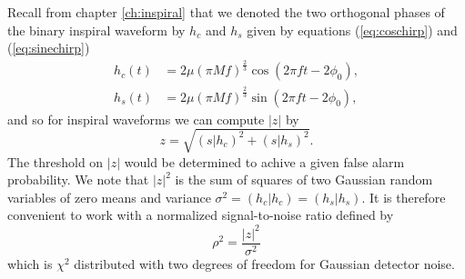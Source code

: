 Recall from chapter \ref{ch:inspiral} that we denoted the two orthogonal
phases of the binary inspiral waveform by $h_c$ and $h_s$ given by equations
(\ref{eq:coschirp}) and (\ref{eq:sinechirp})
\begin{align}
h_c(t) & = 2\mu (\pi M f)^{\frac{2}{3}} \cos(2\pi f t - 2\phi_0), \\
h_s(t) & = 2\mu (\pi M f)^{\frac{2}{3}} \sin(2\pi f t - 2\phi_0),
\end{align}
and so for inspiral waveforms we can compute $|z|$ by
\begin{equation}
z = \sqrt{(s|h_c)^2 + (s|h_s)^2}.
\end{equation}
The threshold on $|z|$ would be determined to achive a given false alarm
probability. We note that $|z|^2$ is the sum of squares of two Gaussian random
variables of zero means and variance $\sigma^2 = (h_c|h_c) = (h_s|h_s)$. It is
therefore convenient to work with a normalized signal-to-noise ratio
defined by
\begin{equation}
\rho^2 = \frac{|z|^2}{\sigma^2}
\label{eq:snrrootdef}
\end{equation}
which is $\chi^2$ distributed with two degrees of freedom for Gaussian
detector noise.

